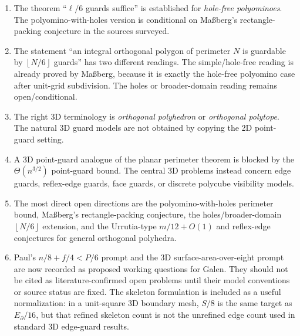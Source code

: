 \documentclass[11pt]{article}
\newcommand{\floor}[1]{\left\lfloor #1 \right\rfloor}
\begin{document}
\begin{enumerate}
  \item The theorem ``$\ell/6$ guards suffice'' is established for
  \emph{hole-free polyominoes}.  The polyomino-with-holes version is
  conditional on Ma{\ss}berg's rectangle-packing conjecture in the sources
  surveyed.

  \item The statement ``an integral orthogonal polygon of perimeter $N$ is
  guardable by $\floor{N/6}$ guards'' has two different readings.  The
  simple/hole-free reading is already proved by Ma{\ss}berg, because it is
  exactly the hole-free polyomino case after unit-grid subdivision.  The holes
  or broader-domain reading remains open/conditional.

  \item The right 3D terminology is \emph{orthogonal polyhedron} or
  \emph{orthogonal polytope}.  The natural 3D guard models are not obtained by
  copying the 2D point-guard setting.

  \item A 3D point-guard analogue of the planar perimeter theorem is blocked by
  the $\Theta(n^{3/2})$ point-guard bound.  The central 3D problems instead
  concern edge guards, reflex-edge guards, face guards, or discrete polycube
  visibility models.

  \item The most direct open directions are the polyomino-with-holes
  perimeter bound, Ma{\ss}berg's rectangle-packing conjecture, the
  holes/broader-domain $\floor{N/6}$ extension, and the Urrutia-type
  $m/12+O(1)$ and reflex-edge conjectures for general orthogonal polyhedra.

  \item Paul's $n/8+f/4<P/6$ prompt and the 3D surface-area-over-eight prompt
  are now recorded as proposed working questions for Galen.  They should not be
  cited as literature-confirmed open problems until their model conventions or
  source status are fixed.  The skeleton formulation is included as a useful
  normalization: in a unit-square 3D boundary mesh, $S/8$ is the same target as
  $E_{\partial}/16$, but that refined skeleton count is not the unrefined edge
  count used in standard 3D edge-guard results.
\end{enumerate}
\end{document}
